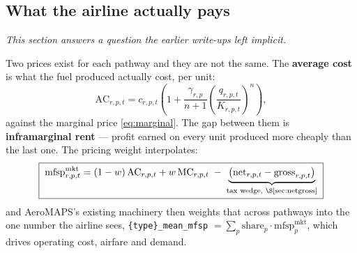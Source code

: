 \documentclass[11pt,a4paper]{article}
\newcommand{\var}[1]{\texttt{\small #1}}
\begin{document}
\subsection{What the airline actually pays}
\label{sec:whopays}

\emph{This section answers a question the earlier write-ups left implicit.}

Two prices exist for each pathway and they are not the same. The \textbf{average cost}
is what the fuel produced actually cost, per unit:
\begin{equation}
\mathrm{AC}_{r,p,t} = c_{r,p,t}\left(1 + \frac{\gamma_{r,p}}{n+1}
  \left(\frac{q_{r,p,t}}{K_{r,p,t}}\right)^{n}\right),
\end{equation}
against the marginal price \eqref{eq:marginal}. The gap between them is
\textbf{inframarginal rent} --- profit earned on every unit produced more cheaply than
the last one. The pricing weight interpolates:
\begin{equation}
\boxed{\;\mathrm{mfsp}^{\mathrm{mkt}}_{r,p,t}
  = (1-w)\,\mathrm{AC}_{r,p,t} + w\,\mathrm{MC}_{r,p,t}
  \;-\;\underbrace{\left(\mathrm{net}_{r,p,t}-\mathrm{gross}_{r,p,t}\right)}_{\text{tax wedge, \S\ref{sec:netgross}}}\;}
\label{eq:marketmfsp}
\end{equation}
and AeroMAPS's existing machinery then weights that across pathways into the one number
the airline sees, \var{\{type\}\_mean\_mfsp} $= \sum_p \mathrm{share}_{p}\cdot
\mathrm{mfsp}^{\mathrm{mkt}}_{p}$, which drives operating cost, airfare and demand.
\end{document}
